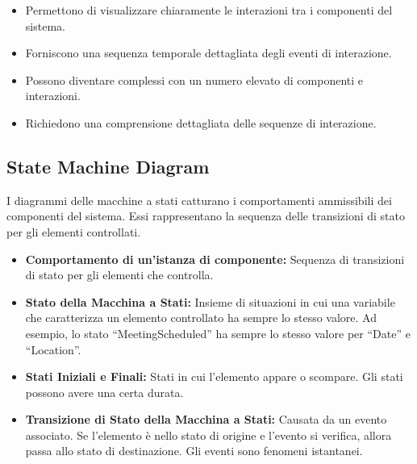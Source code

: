 \begin{tcolorbox}[colback=green!5!white,colframe=green!75!black,title=Vantaggi dei 
    Diagrammi delle Tracce degli Eventi]
    \begin{itemize}
        \item Permettono di visualizzare chiaramente le interazioni tra i componenti 
        del sistema.
        \item Forniscono una sequenza temporale dettagliata degli eventi di interazione.
    \end{itemize}
\end{tcolorbox}

\begin{tcolorbox}[colback=red!5!white,colframe=red!75!black,title=Svantaggi dei 
    Diagrammi delle Tracce degli Eventi]
    \begin{itemize}
        \item Possono diventare complessi con un numero elevato di componenti e interazioni.
        \item Richiedono una comprensione dettagliata delle sequenze di interazione.
    \end{itemize}
\end{tcolorbox}
\subsection{State Machine Diagram}
I diagrammi delle macchine a stati catturano i comportamenti ammissibili dei componenti del sistema. Essi rappresentano la sequenza delle transizioni di stato per gli elementi controllati.

\begin{itemize}
    \item \textbf{Comportamento di un'istanza di componente:} Sequenza di transizioni di
    stato per gli elementi che controlla.
    \item \textbf{Stato della Macchina a Stati:} Insieme di situazioni in cui una variabile
    che caratterizza un elemento controllato ha sempre lo stesso valore. Ad esempio,
    lo stato ``MeetingScheduled'' ha sempre lo stesso valore per ``Date'' e ``Location''.
    \item \textbf{Stati Iniziali e Finali:} Stati in cui l'elemento appare o scompare.
    Gli stati possono avere una certa durata.
    \item \textbf{Transizione di Stato della Macchina a Stati:} Causata da un evento
    associato. Se l'elemento è nello stato di origine e l'evento si verifica, allora passa allo stato di destinazione. Gli eventi sono fenomeni istantanei.
\end{itemize}

